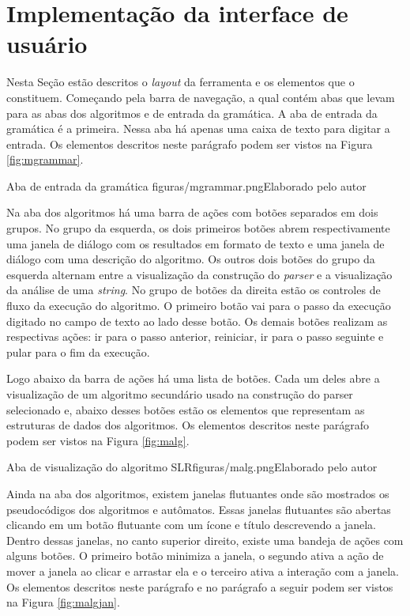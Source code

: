 \section{Implementação da interface de usuário}
Nesta Seção estão descritos o \textit{layout} da ferramenta e os elementos que o constituem. Começando pela barra de navegação, a qual contém abas que levam para as abas dos algoritmos e de entrada da gramática. A aba de entrada da gramática é a primeira. Nessa aba há apenas uma caixa de texto para digitar a entrada. Os elementos descritos neste parágrafo podem ser vistos na Figura \ref{fig:mgrammar}.


\begin{mypicture}{\label{fig:mgrammar}}{Aba de entrada da gramática}
	{figuras/mgrammar.png}{Elaborado pelo autor}
\end{mypicture}

Na aba dos algoritmos há uma barra de ações com botões separados em dois grupos. No grupo da esquerda, os dois primeiros botões abrem respectivamente uma janela de diálogo com os resultados em formato de texto e uma janela de diálogo com uma descrição do algoritmo. Os outros dois botões do grupo da esquerda alternam entre a visualização da construção do \textit{parser} e a visualização da análise de uma \textit{string}. No grupo de botões da direita estão os controles de fluxo da execução do algoritmo. O primeiro botão vai para o passo da execução digitado no campo de texto ao lado desse botão. Os demais botões realizam as respectivas ações: ir para o passo anterior, reiniciar, ir para o passo seguinte e pular para o fim da execução.


Logo abaixo da barra de ações há uma lista de botões. Cada um deles abre a visualização de um algoritmo secundário usado na construção do parser selecionado e, abaixo desses botões estão os elementos que representam as estruturas de dados dos algoritmos. Os elementos descritos neste parágrafo podem ser vistos na Figura \ref{fig:malg}.


\begin{mypicture}{ \label{fig:malg}}{Aba de visualização do algoritmo SLR}{figuras/malg.png}{Elaborado pelo autor}
\end{mypicture}
\FloatBarrier


Ainda na aba dos algoritmos, existem janelas flutuantes onde são mostrados os pseudocódigos dos algoritmos e autômatos. Essas janelas flutuantes são abertas clicando em um botão flutuante com um ícone e título descrevendo a janela. Dentro dessas janelas, no canto superior direito, existe uma bandeja de ações com alguns botões. O primeiro botão minimiza a janela, o segundo ativa a ação de mover a janela ao clicar e arrastar ela e o terceiro ativa a interação com a janela. Os elementos descritos neste parágrafo e no parágrafo a seguir podem ser vistos na Figura \ref{fig:malgjan}.


